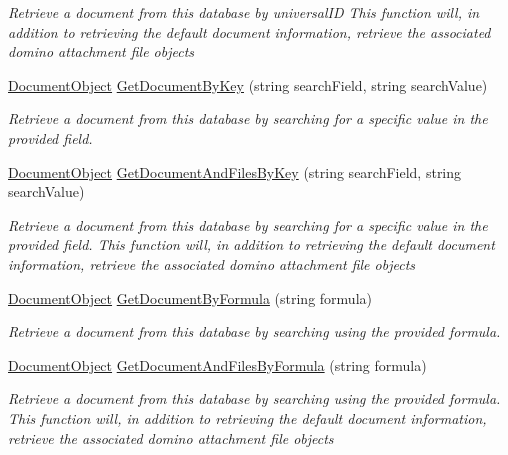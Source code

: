 \begin{DoxyCompactItemize}
\begin{DoxyCompactList}\small\item\em Retrieve a document from this database by universal\+ID This function will, in addition to retrieving the default document information, retrieve the associated domino attachment file objects \end{DoxyCompactList}\item 
\mbox{\hyperlink{class_document_object}{Document\+Object}} \mbox{\hyperlink{class_database_object_a57bfc77d2754236cbcf6ac30a90da529}{Get\+Document\+By\+Key}} (string search\+Field, string search\+Value)
\begin{DoxyCompactList}\small\item\em Retrieve a document from this database by searching for a specific value in the provided field. \end{DoxyCompactList}\item 
\mbox{\hyperlink{class_document_object}{Document\+Object}} \mbox{\hyperlink{class_database_object_a30968034c65328e44ddb0fdac8ab1435}{Get\+Document\+And\+Files\+By\+Key}} (string search\+Field, string search\+Value)
\begin{DoxyCompactList}\small\item\em Retrieve a document from this database by searching for a specific value in the provided field. This function will, in addition to retrieving the default document information, retrieve the associated domino attachment file objects \end{DoxyCompactList}\item 
\mbox{\hyperlink{class_document_object}{Document\+Object}} \mbox{\hyperlink{class_database_object_ae5477aedfcd0d54b21017faa1389bc71}{Get\+Document\+By\+Formula}} (string formula)
\begin{DoxyCompactList}\small\item\em Retrieve a document from this database by searching using the provided formula. \end{DoxyCompactList}\item 
\mbox{\hyperlink{class_document_object}{Document\+Object}} \mbox{\hyperlink{class_database_object_a1d35f51baee4be6adb69a954efe5b4bf}{Get\+Document\+And\+Files\+By\+Formula}} (string formula)
\begin{DoxyCompactList}\small\item\em Retrieve a document from this database by searching using the provided formula. This function will, in addition to retrieving the default document information, retrieve the associated domino attachment file objects \end{DoxyCompactList}\item 

\end{DoxyCompactItemize}
